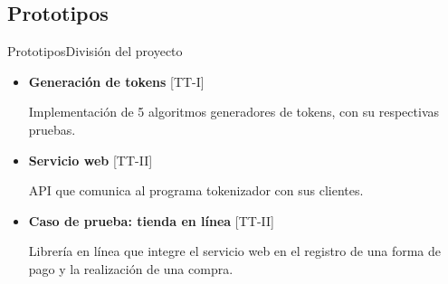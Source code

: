 %
%
%

\subsection{Prototipos}

\begin{frame}{Prototipos}{División del proyecto}

  \begin{itemize}
    \item \textbf{Generación de tokens} [TT-I]

      Implementación de 5 algoritmos generadores de tokens, con su
      respectivas pruebas.
      \newline

    \item \textbf{Servicio web} [TT-II]

      API que comunica al programa tokenizador con sus clientes.
      \newline

    \item \textbf{Caso de prueba: tienda en línea} [TT-II]

      Librería en línea que integre el servicio web en el registro
      de una forma de pago y la realización de una compra.
      \newline

  \end{itemize}


\end{frame}

